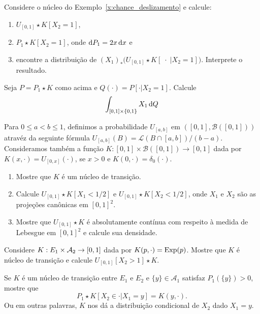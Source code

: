 \begin{exercise}
  Considere o núcleo do Exemplo~\ref{x:chance_deslizamento} e calcule:
  \begin{enumerate}[\quad a)]
  \item $U_{[0,1]} \star K [X_2 = 1]$,
  \item $P_1 \star K [X_2 = 1]$, onde $\mathop{}\!\mathrm{d} P_1 = 2x \mathop{}\!\mathrm{d} x$ e
  \item encontre a distribuição de $(X_1)_* \big( U_{[0,1]} \star K [\; \cdot \; | X_2 = 1] \big)$. Interprete o resultado.
  \end{enumerate}
\end{exercise}

\begin{exercise}
  Seja $P = P_1 \star K$ como acima e $Q(\cdot) = P[\cdot | X_2 = 1]$.
  Calcule
  \begin{equation}
    \int_{[0,1] \times \{0,1\}} X_1 \mathop{}\!\mathrm{d} Q
  \end{equation}
\end{exercise}

\begin{exercise}
  Para $0 \leq a < b \leq 1$, definimos a probabilidade $U_{[a,b]}$ em $([0,1], \mathcal{B}([0,1]))$ atravéz da seguinte fórmula $U_{[a,b]}(B) = \mathcal{L}(B \cap [a,b])/(b-a)$.
  Consideramos também a função $K:[0,1] \times \mathcal{B}([0,1]) \to [0,1]$ dada por $K(x, \cdot) = U_{[0,x]} (\cdot)$, se $x > 0$ e $K(0, \cdot) = \delta_0(\cdot)$.
  \begin{enumerate}[\quad a)]
  \item Mostre que $K$ é um núcleo de transição.
  \item Calcule $U_{[0,1]} \star K [X_1 < 1/2]$ e $U_{[0,1]} \star K [X_2 < 1/2]$, onde $X_1$ e $X_2$ são as projeções canônicas em $[0,1]^2$.
  \item Mostre que $U_{[0,1]} \star K$ é absolutamente contínua com respeito à medida de Lebesgue em $[0,1]^2$ e calcule sua densidade.
\end{enumerate}

\end{exercise}

\begin{exercise}
  Considere $K:E_1 \times {\ensuremath{\mathcal A}}_2 \to [0,1]$ dada por $K(p, \cdot) = \operatorname{Exp}(p)$.
  Mostre que $K$ é núcleo de transição e calcule $U_{[0,1]}[X_2 > 1] \star K$.
\end{exercise}

\begin{exercise}
  Se $K$ é um núcleo de transição entre $E_1$ e $E_2$ e $\{y\} \in \mathcal{A}_1$ satisfaz $P_1(\{y\}) > 0$, mostre que
  \begin{equation}
    P_1 \star K [X_2 \in \cdot | X_1 = y] = K(y, \cdot).
  \end{equation}
  Ou em outras palavras, $K$ nos dá a distribuição condicional de $X_2$ dado $X_1 = y$.
\end{exercise}

